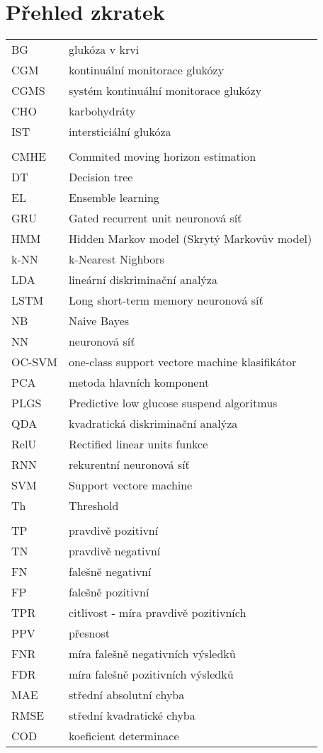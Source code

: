\chapter*{Přehled zkratek}

\begin{tabular}{ll}
BG & glukóza v krvi\\
CGM & kontinuální monitorace glukózy\\
CGMS & systém kontinuální monitorace glukózy\\
CHO & karbohydráty\\
IST & intersticiální glukóza\\
\\
CMHE & Commited moving horizon estimation\\
DT & Decision tree\\
EL & Ensemble learning\\
GRU & Gated recurrent unit neuronová síť\\
HMM & Hidden Markov model (Skrytý Markovův model)\\
k-NN  & k-Nearest Nighbors\\
LDA & lineární diskriminační analýza\\
LSTM & Long short-term memory neuronová síť\\
NB & Naive Bayes\\
NN & neuronová síť\\
OC-SVM & one-class support vectore machine klasifikátor\\
PCA & metoda hlavních komponent\\
PLGS & Predictive low glucose suspend algoritmus\\
QDA & kvadratická diskriminační analýza\\
RelU & Rectified linear units funkce\\
RNN & rekurentní neuronová síť\\
SVM  & Support vectore machine\\
Th & Threshold\\
\\
TP & pravdivě pozitivní\\
TN & pravdivě negativní\\
FN & falešně negativní\\
FP & falešně pozitivní\\
TPR & citlivost - míra pravdivě pozitivních\\
PPV & přesnost\\
FNR & míra falešně negativních výsledků \\
FDR & míra falešně pozitivních výsledků\\
MAE & střední absolutní chyba\\
RMSE & střední kvadratické chyba\\
COD & koeficient determinace
\end{tabular}
